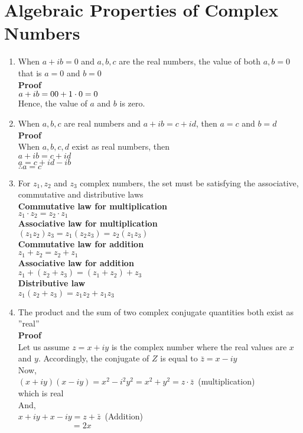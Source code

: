 \documentclass[12pt]{report}
\newcommand{\sps}{\\[0.2cm]}
\newcommand{\bt}[1]{\textbf{#1}}
\newcommand{\dsp}{\displaystyle}
\begin{document}
	\section{Algebraic Properties of Complex Numbers}
	\begin{enumerate}
		\item When $a+ib=0$ and $a,b,c$ are the real numbers, the value of both $a,b=0$ that is $a=0$ and $b=0$\sps
		\bt{Proof}\sps
		$\dsp
		a+ib=0\\
		0+1\cdot 0 = 0
		$\sps
		Hence, the value of $a$ and $b$ is zero. \\
		\item When $a,b,c$ are real numbers and $a+ib=c+id$, then $a=c$ and $b=d$\sps
		\bt{Proof}\sps
		When $a,b,c,d$ exist as real numbers, then\\
		$a+ib=c+id$\\
		$a=c+id-ib$\\
		$\therefore a=c$\\
		\item For $z_1, z_2$ and $z_3$ complex numbers, the set must be satisfying the associative, commutative and distributive laws\sps
		\bt{Commutative law for multiplication}\\
		$z_1\cdot z_2 = z_2 \cdot z_1$\sps
		\bt{Associative law for multiplication}\\
		$(z_1z_2)z_3 = z_1(z_2z_3) = z_2(z_1z_3)$\sps
		\bt{Commutative law for addition}\\
		$z_1 + z_2 = z_2 + z_1$\sps
		\bt{Associative law for addition}\\
		$z_1+(z_2+z_3) = (z_1+z_2) + z_3$\sps
		\bt{Distributive law}\\
		$z_1(z_2+z_3) = z_1z_2 + z_1z_3$\sps
		\item The product and the sum of two complex conjugate quantities both exist as ''real''\\
		\bt{Proof}\sps
		Let us assume $z=x+iy$ is the complex number where the real values are $x$ and $y$. Accordingly, the conjugate of $Z$ is equal to $\bar{z} = x-iy$\\
		Now,\\
		$(x+iy)(x-iy) = x^2-i^2y^2 = x^2 + y^2 = z\cdot \bar{z}$~(multiplication)\\
		which is real\\
		And,\\
		$x+iy + x-iy = z + \bar{z}$~(Addition)\\
		${}\qquad\qquad\qquad~~=2x$\\

\end{enumerate}
\end{document}
